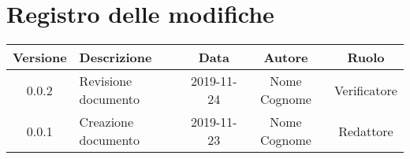 \section*{Registro delle modifiche}

\begin{center}
	\begin{longtable}{|c|p{5cm}|c|c|c|}
	\hline
	\rowcolor{lighter-grayer}
	\textbf{Versione} & \textbf{Descrizione} & \textbf{Data} & \textbf{Autore} & \textbf{Ruolo} \\
	\hline
	\endfirsthead


	0.0.2 & Revisione documento & 2019-11-24 & Nome Cognome & Verificatore \\
	\hline
	0.0.1 & Creazione documento & 2019-11-23 & Nome Cognome & Redattore \\
	\hline

	\end{longtable}
\end{center}